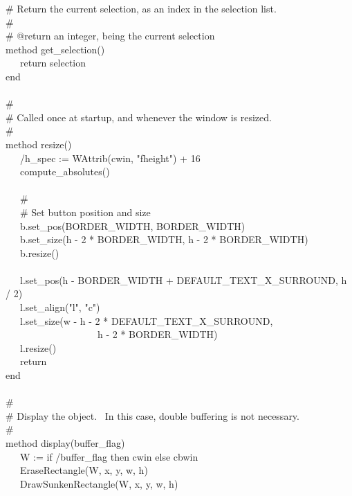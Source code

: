 {\>   \# Return the current selection, as an index in the selection list. \\
\>   \# \\
\>   \# @return an integer, being the current selection \\
\>   method get\_selection() \\
\>   \ \ \ return selection \\
\>   end \\
\ \\
\>   \# \\
\>   \# Called once at startup, and whenever the window is resized. \\
\>   \# \\
\>   method resize() \\
\>   \ \ \ /h\_spec := WAttrib(cwin, "fheight") + 16 \\
\>   \ \ \ compute\_absolutes() \\
\ \\
\>   \ \ \ \# \\
\>   \ \ \ \# Set button position and size \\
\>   \ \ \ b.set\_pos(BORDER\_WIDTH, BORDER\_WIDTH) \\
\>   \ \ \ b.set\_size(h - 2 * BORDER\_WIDTH, h - 2 * BORDER\_WIDTH) \\
\>   \ \ \ b.resize() \\
\ \\
\>   \ \ \ l.set\_pos(h - BORDER\_WIDTH +
DEFAULT\_TEXT\_X\_SURROUND, h / 2) \\
\>   \ \ \ l.set\_align("l",
"c") \\
\>   \ \ \ l.set\_size(w - h - 2 *
DEFAULT\_TEXT\_X\_SURROUND, \\
\>   \ \ \ \ \ \ \ \ \ \ \ \ \ \ \ \ \ \ \ h - 2 * BORDER\_WIDTH) \\
\>   \ \ \ l.resize() \\
\>   \ \ \ return \\
\>   end \\
\ \\
\>   \# \\
\>   \# Display the object. \ In this case, double buffering is not necessary.\\
\>   \# \\
\>   method display(buffer\_flag) \\
\>   \ \ \ W := if /buffer\_flag then cwin else cbwin \\
\>   \ \ \ EraseRectangle(W, x, y, w, h) \\
\>   \ \ \ DrawSunkenRectangle(W, x, y, w, h) \\
}
